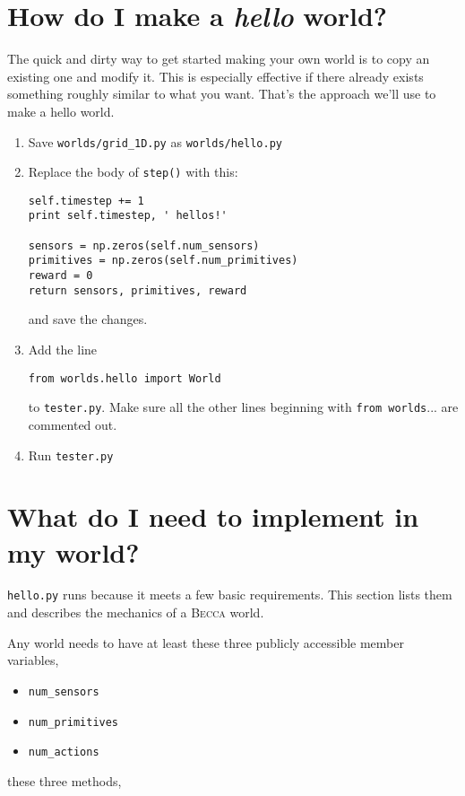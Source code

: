 \section{How do I make a {\em hello} world?}

The quick and dirty way to get started making your own world is to copy an existing one and modify it. This is especially effective if there already exists something roughly similar to what you want. That's the approach we'll use to make a hello world.

\begin{enumerate}
\item{Save \texttt{worlds/grid\_1D.py} as \texttt{worlds/hello.py}}
\item{Replace the body of \texttt{step()} with this:
\begin{verbatim}
self.timestep += 1 
print self.timestep, ' hellos!'

sensors = np.zeros(self.num_sensors)
primitives = np.zeros(self.num_primitives)
reward = 0
return sensors, primitives, reward
\end{verbatim}
and save the changes.
}
\item{Add the line 
\begin{verbatim}
from worlds.hello import World
\end{verbatim}
to \texttt{tester.py}. Make sure all the other lines beginning with \texttt{from worlds}...  are commented out.
}
\item{Run \texttt{tester.py}}
\end{enumerate}


\section{What do I need to implement in my world?}

\texttt{hello.py} runs because it meets a few basic requirements. This section lists them and describes the mechanics of a \textsc{Becca} world.

Any world needs to have at least these three publicly accessible member variables,

\begin{itemize}
\item{\texttt{num\_sensors}}
\item{\texttt{num\_primitives}}
\item{\texttt{num\_actions}}
\end{itemize}

these three methods,

